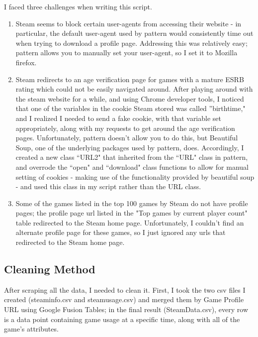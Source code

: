 \documentclass[pdftex,12pt,a4paper]{article}
\begin{document}
I faced three challenges when writing this script. 
\begin{enumerate}
\item Steam seems to block certain user-agents from accessing their website - in particular, the default user-agent used by pattern would consistently time out when trying to download a profile page. Addressing this was relatively easy; pattern allows you to manually set your user-agent, so I set it to Mozilla firefox.
\item Steam redirects to an age verification page for games with a mature ESRB rating which could not be easily navigated around. After playing around with the steam website for a while, and using Chrome developer tools, I noticed that one of the variables in the cookie Steam stored was called ''birthtime," and I realized I needed to send a fake cookie, with that variable set appropriately, along with my requests to get around the age verification pages. Unfortunately, pattern doesn't allow you to do this, but Beautiful Soup, one of the underlying packages used by pattern, does. Accordingly, I created a new class ``URL2" that inherited from the ``URL" class in pattern, and overrode the ``open" and ``download" class functions to allow for manual setting of cookies - making use of the functionality provided by beautiful soup - and used this class in my script rather than the URL class.
\item Some of the games listed in the top 100 games by Steam do not have profile pages; the profile page url listed in the "Top games by current player count" table redirected to the Steam home page. Unfortunately, I couldn't find an alternate profile page for these games, so I just ignored any urls that redirected to the Steam home page.
\end{enumerate}

\subsection{Cleaning Method}
After scraping all the data, I needed to clean it. First, I took the two csv files I created (steaminfo.csv and steamusage.csv) and merged them by Game Profile URL using Google Fusion Tables; in the final result (SteamData.csv), every row is a data point containing game usage at a specific time, along with all of the game's attributes. \\ \\
\end{document}
